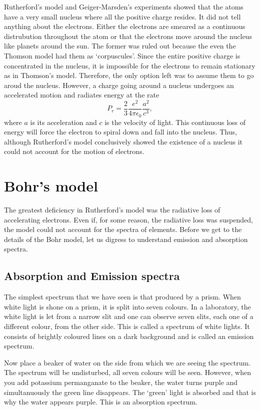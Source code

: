 Rutherford's model and Geiger-Marsden's experiments showed that the atoms have
a very small nucleus where all the positive charge resides. It did not tell 
anything about the electrons. Either the electrons are smeared as a continuous
distrubution throughout the atom or that the electrons move around the nucleus
like planets around the sun. The former was ruled out because the even the
Thomson model had them as `corpuscules'. Since the entire positive charge is
concentrated in the nucleus, it is impossible for the electrons to remain
stationary as in Thomson's model. Therefore, the only option left was to assume
them to go aroud the nucleus. However, a charge going around a nucleus undergoes
an accelerated motion and radiates energy at the rate \cite[equation (20-44)]{
reitz2009foundations}
\begin{equation}\label{c3s2e21}
P_r = \frac{2}{3}\frac{e^2}{4\pi\epsilon_0}\frac{a^2}{c^3},
\end{equation}
where $a$ is its acceleration and $c$ is the velocity of light. This continuous
loss of energy will force the electron to spiral down and fall into the nucleus.
Thus, although Rutherford's model conclusively showed the existence of a nucleus
it could not account for the motion of electrons.

\section{Bohr's model}\label{c3s3}
The greatest deficiency in Rutherford's model was the radiative loss of 
accelerating electrons. Even if, for some reason, the radiative loss was 
suspended, the model could not account for the spectra of elements. Before we 
get to the details of the Bohr model, let us digress to understand emission
and absorption spectra.

\subsection{Absorption and Emission spectra}
The simplest spectrum that we have seen is that produced by a prism. When white
light is shone on a prism, it is split into seven colours. In a laboratory, the
white light is let from a narrow slit and one can observe seven slits, each one
of a different colour, from the other side. This is called a spectrum of white
lights. It consists of brightly coloured lines on a dark background and is 
called an emission spectrum.

Now place a beaker of water on the side from which we are seeing the spectrum.
The spectrum will be undisturbed, all seven colours will be seen. However, when
you add potassium permanganate to the beaker, the water turns purple and 
simultanuously the green line disappears. The `green' light is absorbed and that
is why the water appears purple. This is an absorption spectrum. 

